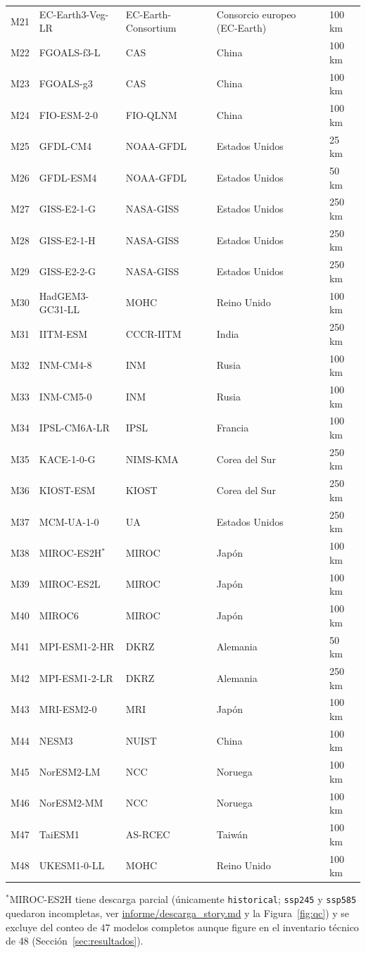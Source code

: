 \documentclass[11pt,a4paper]{article}
\newcommand{\archivo}[1]{\begingroup\hypersetup{urlcolor=black}\url{#1}\endgroup}
\begin{document}
\begin{longtable}{@{}L{0.9cm}L{3.2cm}L{3.0cm}L{\dimexpr\textwidth-0.9cm-3.2cm-3.0cm-2.3cm-8\tabcolsep\relax}L{2.3cm}@{}}
M21 & EC-Earth3-Veg-LR & EC-Earth-Consortium & Consorcio europeo (EC-Earth) & 100 km \\
M22 & FGOALS-f3-L & CAS & China & 100 km \\
M23 & FGOALS-g3 & CAS & China & 100 km \\
M24 & FIO-ESM-2-0 & FIO-QLNM & China & 100 km \\
M25 & GFDL-CM4 & NOAA-GFDL & Estados Unidos & 25 km \\
M26 & GFDL-ESM4 & NOAA-GFDL & Estados Unidos & 50 km \\
M27 & GISS-E2-1-G & NASA-GISS & Estados Unidos & 250 km \\
M28 & GISS-E2-1-H & NASA-GISS & Estados Unidos & 250 km \\
M29 & GISS-E2-2-G & NASA-GISS & Estados Unidos & 250 km \\
M30 & HadGEM3-GC31-LL & MOHC & Reino Unido & 100 km \\
M31 & IITM-ESM & CCCR-IITM & India & 250 km \\
M32 & INM-CM4-8 & INM & Rusia & 100 km \\
M33 & INM-CM5-0 & INM & Rusia & 100 km \\
M34 & IPSL-CM6A-LR & IPSL & Francia & 100 km \\
M35 & KACE-1-0-G & NIMS-KMA & Corea del Sur & 250 km \\
M36 & KIOST-ESM & KIOST & Corea del Sur & 250 km \\
M37 & MCM-UA-1-0 & UA & Estados Unidos & 250 km \\
M38 & MIROC-ES2H$^{*}$ & MIROC & Jap\'on & 100 km \\
M39 & MIROC-ES2L & MIROC & Jap\'on & 100 km \\
M40 & MIROC6 & MIROC & Jap\'on & 100 km \\
M41 & MPI-ESM1-2-HR & DKRZ & Alemania & 50 km \\
M42 & MPI-ESM1-2-LR & DKRZ & Alemania & 250 km \\
M43 & MRI-ESM2-0 & MRI & Jap\'on & 100 km \\
M44 & NESM3 & NUIST & China & 100 km \\
M45 & NorESM2-LM & NCC & Noruega & 100 km \\
M46 & NorESM2-MM & NCC & Noruega & 100 km \\
M47 & TaiESM1 & AS-RCEC & Taiw\'an & 100 km \\
M48 & UKESM1-0-LL & MOHC & Reino Unido & 100 km \\
\end{longtable}
\noindent $^{*}$MIROC-ES2H tiene descarga parcial (\'unicamente \texttt{historical}; \texttt{ssp245} y \texttt{ssp585} quedaron incompletas, ver \archivo{informe/descarga_story.md} y la Figura~\ref{fig:qc}) y se excluye del conteo de 47 modelos completos aunque figure en el inventario t\'ecnico de 48 (Secci\'on~\ref{sec:resultados}).
\end{document}
